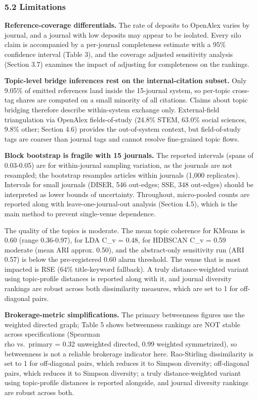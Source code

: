 \documentclass[pdflatex,sn-apa]{sn-jnl}
\begin{document}
\subsubsection{5.2 Limitations}\label{limitations}

\textbf{Reference-coverage differentials.} The rate of deposits to
OpenAlex varies by journal, and a journal with low deposits may appear
to be isolated. Every silo claim is accompanied by a per-journal
completeness estimate with a 95\% confidence interval (Table 3), and the
coverage adjusted sensitivity analysis (Section 3.7) examines the impact
of adjusting for completeness on the rankings.

\textbf{Topic-level bridge inferences rest on the internal-citation
subset.} Only 9.05\% of emitted references land inside the 15-journal
system, so per-topic cross-tag shares are computed on a small minority
of all citations. Claims about topic bridging therefore describe
within-system exchange only. External-field triangulation via OpenAlex
fields-of-study (24.8\% STEM, 63.0\% social sciences, 9.8\% other;
Section 4.6) provides the out-of-system context, but field-of-study tags
are coarser than journal tags and cannot resolve fine-grained topic
flows.

\textbf{Block bootstrap is fragile with 15 journals.} The reported
intervals (spans of 0.03-0.05) are for within-journal sampling
variation, as the journals are not resampled; the bootstrap resamples
articles within journals (1,000 replicates). Intervals for small
journals (DISER, 546 out-edges; SSE, 348 out-edges) should be
interpreted as lower bounds of uncertainty. Throughout, micro-pooled
counts are reported along with leave-one-journal-out analysis (Section
4.5), which is the main method to prevent single-venue dependence.

The quality of the topics is moderate. The mean topic coherence for
KMeans is 0.60 (range 0.36-0.97), for LDA C\_v = 0.48, for HDBSCAN C\_v
= 0.59 moderate (mean ARI approx. 0.50), and the abstract-only
sensitivity run (ARI 0.57) is below the pre-registered 0.60 alarm
threshold. The venue that is most impacted is RSE (64\% title-keyword
fallback). A truly distance-weighted variant using topic-profile
distances is reported along with it, and journal diversity rankings are
robust across both dissimilarity measures, which are set to 1 for
off-diagonal pairs.

\textbf{Brokerage-metric simplifications.} The primary betweenness
figures use the weighted directed graph; Table 5 shows betweenness
rankings are NOT stable across specifications (Spearman \\rho vs.~primary =
0.32 unweighted directed, 0.99 weighted symmetrized), so betweenness is
not a reliable brokerage indicator here. Rao-Stirling dissimilarity is
set to 1 for off-diagonal pairs, which reduces it to Simpson diversity;
off-diagonal pairs, which reduces it to Simpson diversity; a truly
distance-weighted variant using topic-profile distances is reported
alongside, and journal diversity rankings are robust across both.
\end{document}
